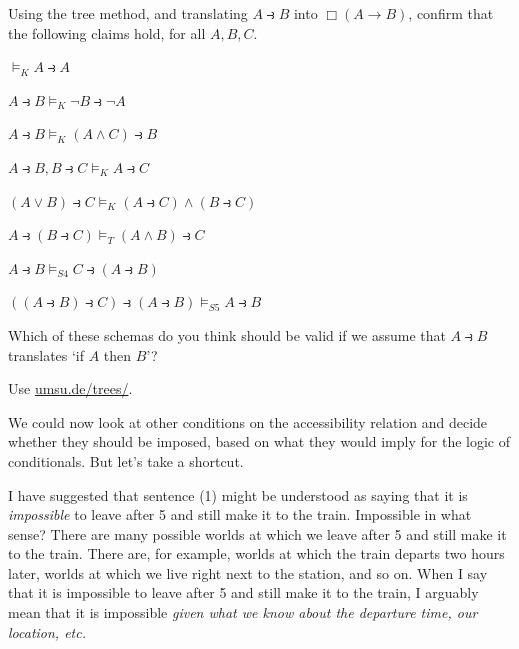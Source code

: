 \begin{exercise}\label{ex:sda-import}
  Using the tree method, and translating $A \strictif B$ into $\Box(A \to B)$, confirm that the following claims hold, for all $A,B,C$.
  \begin{exlist}
  \item $\models_K A \strictif A$
  \item $A \strictif B \models_K \neg B \strictif \neg A$
  \item $A \strictif B \models_K (A \land C) \strictif B$
  \item $A\strictif B, B \strictif C \models_{K} A \strictif C$
  \item $(A \lor B) \strictif C \models_K (A \strictif C) \land (B \strictif C)$
  \item $A \strictif (B \strictif C) \models_T (A \land B) \strictif C$
  \item $A\strictif B \models_{S4} C \strictif (A \strictif B)$
  \item $((A\strictif B) \strictif C) \strictif (A\strictif B) \models_{S5} A\strictif B$
  \end{exlist}
  \medskip

  Which of these schemas do you think should be valid if we
  assume that $A \strictif B$ translates `if $A$ then $B$'?
\end{exercise}
\begin{solution}
  Use \href{https://www.umsu.de/trees/}{umsu.de/trees/}.
\end{solution}


We could now look at other conditions on the accessibility relation and decide
whether they should be imposed, based on what they would imply for the logic of
conditionals. But let's take a shortcut.

I have suggested that sentence (1) might be understood as saying that it is
\emph{impossible} to leave after 5 and still make it to the train. Impossible in
what sense? There are many possible worlds at which we leave after 5 and still
make it to the train. There are, for example, worlds at which the train departs
two hours later, worlds at which we live right next to the station, and so on.
When I say that it is impossible to leave after 5 and still make it to the
train, I arguably mean that it is impossible \emph{given what we know about the
  departure time, our location, etc.}

